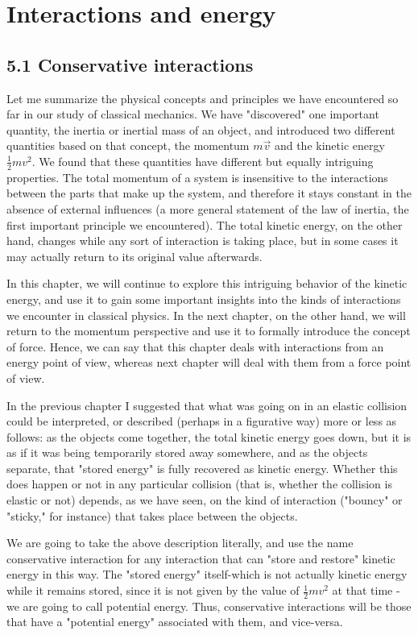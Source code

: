 \documentclass[10pt]{article}
\begin{document}
\section*{Interactions and energy}
\subsection*{5.1 Conservative interactions}
Let me summarize the physical concepts and principles we have encountered so far in our study of classical mechanics. We have "discovered" one important quantity, the inertia or inertial mass of an object, and introduced two different quantities based on that concept, the momentum $m \vec{v}$ and the kinetic energy $\frac{1}{2} m v^{2}$. We found that these quantities have different but equally intriguing properties. The total momentum of a system is insensitive to the interactions between the parts that make up the system, and therefore it stays constant in the absence of external influences (a more general statement of the law of inertia, the first important principle we encountered). The total kinetic energy, on the other hand, changes while any sort of interaction is taking place, but in some cases it may actually return to its original value afterwards.

In this chapter, we will continue to explore this intriguing behavior of the kinetic energy, and use it to gain some important insights into the kinds of interactions we encounter in classical physics. In the next chapter, on the other hand, we will return to the momentum perspective and use it to formally introduce the concept of force. Hence, we can say that this chapter deals with interactions from an energy point of view, whereas next chapter will deal with them from a force point of view.

In the previous chapter I suggested that what was going on in an elastic collision could be interpreted, or described (perhaps in a figurative way) more or less as follows: as the objects come together, the total kinetic energy goes down, but it is as if it was being temporarily stored away somewhere, and as the objects separate, that "stored energy" is fully recovered as kinetic energy. Whether this does happen or not in any particular collision (that is, whether the collision is elastic or not) depends, as we have seen, on the kind of interaction ("bouncy" or "sticky," for instance) that takes place between the objects.

We are going to take the above description literally, and use the name conservative interaction for any interaction that can "store and restore" kinetic energy in this way. The "stored energy" itself-which is not actually kinetic energy while it remains stored, since it is not given by the value of $\frac{1}{2} m v^{2}$ at that time - we are going to call potential energy. Thus, conservative interactions will be those that have a "potential energy" associated with them, and vice-versa.
\end{document}
